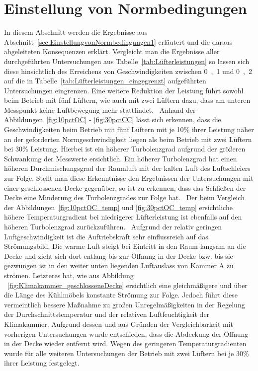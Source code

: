 \section{Einstellung von Normbedingungen}
\label{sec:Einstellung von Normbedingungen_1}

In diesem Abschnitt werden die Ergebnisse aus Abschnitt~\ref{sec:EinstellungvonNormbedingungen1} erläutert und die daraus abgeleiteten Konsequenzen erklärt.
Vergleicht man die Ergebnisse aller durchgeführten Untersuchungen aus Tabelle~\ref{tab:Lüfterleistungen} so lassen sich diese hinsichtlich des Erreichens von Geschwindigkeiten zwischen \unit{0,1}{\meter\per\second} und \unit{0,2}{\meter\per\second} auf die in Tabelle~\ref{tab:Lüfterleistungen_eingegrenzt} aufgeführten Untersuchungen eingrenzen. Eine weitere Reduktion der Leistung führt sowohl beim Betrieb mit fünf Lüftern, wie auch mit zwei Lüftern dazu, dass am unteren Messpunkt keine Luftbewegung mehr stattfindet. \
Anhand der Abbildungen~\ref{fig:10pctOC} - \ref{fig:30pctCC} lässt sich erkennen, dass die Geschwindigkeiten beim Betrieb mit fünf Lüftern mit je \unit{10}{\%} ihrer Leistung näher an der geforderten Normgeschwindigkeit liegen als beim Betrieb mit zwei Lüftern bei \unit{30}{\%} Leistung. Hierbei ist ein höherer Turbolenzgrad aufgrund der größeren Schwankung der Messwerte ersichtlich. Ein höherer Turbolenzgrad hat einen höheren Durchmischungsgrad der Raumluft mit der kalten Luft des Luftschleiers zur Folge. 
Stellt man diese Erkenntnisse den Ergebnissen der Untersuchungen mit einer geschlossenen Decke gegenüber, so ist zu erkennen, dass das Schließen der Decke eine Minderung des Turbolenzgrades zur Folge hat. \
Der beim Vergleich der Abbildungen~\ref{fig:10pctOC_temp} und \ref{fig:30pctOC_temp} ersichtliche höhere Temperaturgradient bei niedrigerer Lüfterleistung ist ebenfalls auf den höheren Turbolenzgrad zurückzuführen. \
Aufgrund der relativ geringen Luftgeschwindigkeit ist die Auftriebskraft sehr einflussreich auf das Strömungsbild. Die warme Luft steigt bei Eintritt in den Raum langsam an die Decke und zieht sich dort entlang bis zur Öffnung in der Decke bzw. bis sie gezwungen ist in den weiter unten liegenden Luftauslass von Kammer A zu strömen.
Letzteres hat, wie aus Abbildung ~\ref{fig:Klimakammer_geschlosseneDecke} ersichtlich eine gleichmäßigere und über die Länge des Kühlmöbels konstante Strömung zur Folge.
Jedoch führt diese vermeintlich bessere Maßnahme zu großen Unregelmäßigkeiten in der Regelung der Durchschnittstemperatur und der relativen Luftfeuchtigkeit der Klimakammer. \newline
Aufgrund dessen und aus Gründen der Vergleichbarkeit mit vorherigen Untersuchungen wurde entschieden, dass die Abdeckung der Öffnung in der Decke wieder entfernt wird. Wegen des geringeren Temperaturgradienten wurde für alle weiteren Untersuchungen der Betrieb mit zwei Lüftern bei je \unit{30}{\%} ihrer Leistung festgelegt.

